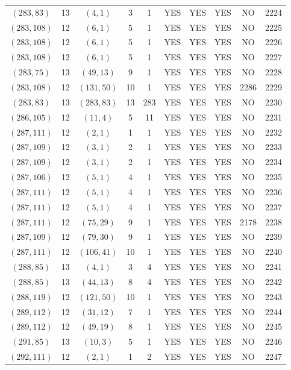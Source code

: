 \begin{longtable}{|c|c|c|c|c|c|c|c|c|c|}
$(283, 83)$ & 13 & $(4, 1)$ & 3 & 1 & YES & YES & YES & NO & 2224\\
$(283, 108)$ & 12 & $(6, 1)$ & 5 & 1 & YES & YES & YES & NO & 2225\\
$(283, 108)$ & 12 & $(6, 1)$ & 5 & 1 & YES & YES & YES & NO & 2226\\
$(283, 108)$ & 12 & $(6, 1)$ & 5 & 1 & YES & YES & YES & NO & 2227\\
$(283, 75)$ & 13 & $(49, 13)$ & 9 & 1 & YES & YES & YES & NO & 2228\\
$(283, 108)$ & 12 & $(131, 50)$ & 10 & 1 & YES & YES & YES & 2286 & 2229\\
$(283, 83)$ & 13 & $(283, 83)$ & 13 & 283 & YES & YES & YES & NO & 2230\\
$(286, 105)$ & 12 & $(11, 4)$ & 5 & 11 & YES & YES & YES & NO & 2231\\
$(287, 111)$ & 12 & $(2, 1)$ & 1 & 1 & YES & YES & YES & NO & 2232\\
$(287, 109)$ & 12 & $(3, 1)$ & 2 & 1 & YES & YES & YES & NO & 2233\\
$(287, 109)$ & 12 & $(3, 1)$ & 2 & 1 & YES & YES & YES & NO & 2234\\
$(287, 106)$ & 12 & $(5, 1)$ & 4 & 1 & YES & YES & YES & NO & 2235\\
$(287, 111)$ & 12 & $(5, 1)$ & 4 & 1 & YES & YES & YES & NO & 2236\\
$(287, 111)$ & 12 & $(5, 1)$ & 4 & 1 & YES & YES & YES & NO & 2237\\
$(287, 111)$ & 12 & $(75, 29)$ & 9 & 1 & YES & YES & YES & 2178 & 2238\\
$(287, 109)$ & 12 & $(79, 30)$ & 9 & 1 & YES & YES & YES & NO & 2239\\
$(287, 111)$ & 12 & $(106, 41)$ & 10 & 1 & YES & YES & YES & NO & 2240\\
$(288, 85)$ & 13 & $(4, 1)$ & 3 & 4 & YES & YES & YES & NO & 2241\\
$(288, 85)$ & 13 & $(44, 13)$ & 8 & 4 & YES & YES & YES & NO & 2242\\
$(288, 119)$ & 12 & $(121, 50)$ & 10 & 1 & YES & YES & YES & NO & 2243\\
$(289, 112)$ & 12 & $(31, 12)$ & 7 & 1 & YES & YES & YES & NO & 2244\\
$(289, 112)$ & 12 & $(49, 19)$ & 8 & 1 & YES & YES & YES & NO & 2245\\
$(291, 85)$ & 13 & $(10, 3)$ & 5 & 1 & YES & YES & YES & NO & 2246\\
$(292, 111)$ & 12 & $(2, 1)$ & 1 & 2 & YES & YES & YES & NO & 2247\\

\end{longtable}
